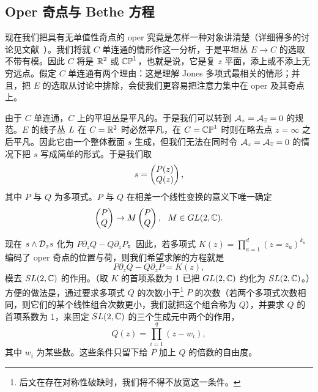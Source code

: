 \subsection{Oper 奇点与 Bethe 方程}\label{opbethe}


现在我们把具有无单值性奇点的 oper 究竟是怎样一种对象讲清楚（详细得多的讨论见文献~\cite{Frenkel}）。我们将就 $C$ 单连通的情形作这一分析，于是平坦丛 $E\to C$ 的选取不带有模。因此 $C$ 将是 $\R^2$ 或 $\Bbb{CP}^1$，也就是说，它是复 $z$ 平面，添上或不添上无穷远点。假定 $C$ 单连通有两个理由：这是理解 Jones 多项式最相关的情形；并且，把 $E$ 的选取从讨论中排除，会使我们更容易把注意力集中在 oper 及其奇点上。

由于 $C$ 单连通，$C$ 上的平坦丛是平凡的。于是我们可以转到 $\A_z = \A_{\bar z}=0$ 的规范。$E$ 的线子丛 $\L$ 在 $C=\R^2$ 时必然平凡，在 $C=\Bbb{CP}^1$ 时则在略去点 $z=\infty$ 之后平凡。因此它由一个整体截面 $s$ 生成，但我们无法在同时令 $\A_z=\A_{\bar z}=0$ 的情况下把 $s$ 写成简单的形式。于是我们取\begin{equation}\label{nuptriz}s=\begin{pmatrix} P(z)\cr Q(z)\end{pmatrix},\end{equation}
其中 $P$ 与 $Q$ 为多项式。$P$ 与 $Q$ 在相差一个线性变换的意义下唯一确定
\begin{equation}\label{helf}\begin{pmatrix}P\cr Q
\end{pmatrix}\to M\begin{pmatrix}P\cr Q
\end{pmatrix},~~M\in GL(2,\C).\end{equation}

现在 $s\wedge \D_z s$ 化为 $P\partial_zQ-Q\partial_zP$。因此，若多项式 $K(z)=\prod_{a=1}^d(z=z_a)^{k_a}$ 编码了 oper 奇点的位置与荷，则我们希望求解的方程就是
\begin{equation}\label{omicro} P\partial_z Q-Q\partial_zP = K(z),\end{equation}
模去 $SL(2,\C)$ 的作用。（取 $K$ 的首项系数为 1 已把 $GL(2,\C)$ 约化为 $SL(2,\C)$。）方便的做法是，通过要求多项式 $Q$ 的次数小于\footnote{后文在存在对称性破缺时，我们将不得不放宽这一条件。} $P$ 的次数（若两个多项式次数相同，则它们的某个线性组合次数更小，我们就把这个组合称为 $Q$），并要求 $Q$ 的首项系数为 1，来固定 $SL(2,\C)$ 的三个生成元中两个的作用，
\begin{equation}\label{zeroes}Q(z)=\prod_{i=1}^q (z-w_i),\end{equation}
其中 $w_i$ 为某些数。这些条件只留下给 $P$ 加上 $Q$ 的倍数的自由度。

